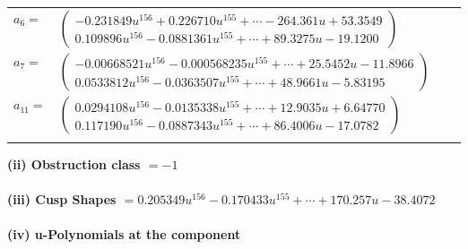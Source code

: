 \documentclass[1p]{elsarticle_modified}
\theoremstyle{definition}
\begin{document}
\begin{tabular}{m{7pt} m{180pt} m{7pt} m{180pt} }
\flushright $a_{6}=$&$\begin{pmatrix}-0.231849 u^{156}+0.226710 u^{155}+\cdots-264.361 u+53.3549\\0.109896 u^{156}-0.0881361 u^{155}+\cdots+89.3275 u-19.1200\end{pmatrix}$ \\
\flushright $a_{7}=$&$\begin{pmatrix}-0.00668521 u^{156}-0.000568235 u^{155}+\cdots+25.5452 u-11.8966\\0.0533812 u^{156}-0.0363507 u^{155}+\cdots+48.9661 u-5.83195\end{pmatrix}$ \\
\flushright $a_{11}=$&$\begin{pmatrix}0.0294108 u^{156}-0.0135338 u^{155}+\cdots+12.9035 u+6.64770\\0.117190 u^{156}-0.0887343 u^{155}+\cdots+86.4006 u-17.0782\end{pmatrix}$\\&\end{tabular}
\flushleft \textbf{(ii) Obstruction class $= -1$}\\~\\
\flushleft \textbf{(iii) Cusp Shapes $= 0.205349 u^{156}-0.170433 u^{155}+\cdots+170.257 u-38.4072$}\\~\\
\newpage\renewcommand{\arraystretch}{1}
\flushleft \textbf{(iv) u-Polynomials at the component}\newline \\
\end{document}
